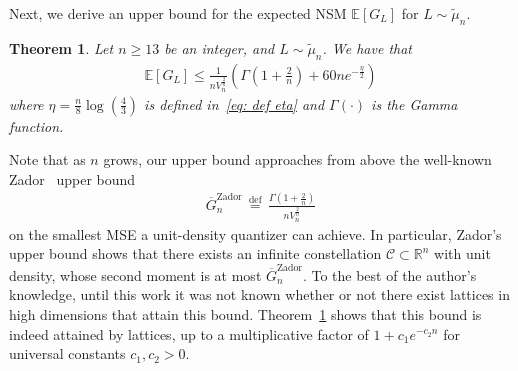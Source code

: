 \documentclass[article,doublecolumn]{IEEEtran}
\newcommand{\EE}{{\mathbb{E}}}
\newcommand{\df}{{\, \stackrel{\mathrm{def}}{=}\, }}
\newcommand{\R}{{\mathbb{R}}}
\newcommand{\CC}{{\mathcal{C}}}
\newtheorem{thm}{Theorem}[section]
\begin{document}
Next, we derive an upper bound for the expected NSM $\EE[G_L]$ for $L\sim\tilde{\mu}_n$.


\begin{thm}
Let $n\geq 13$ be an integer, and $L\sim\tilde{\mu}_n$. We have that
\begin{align}
 \EE[G_L]\leq \frac{1}{n V_n^{\frac{2}{n}}}\left(\Gamma\left(1+\frac{2}{n}\right)+60 ne^{-\frac{\eta}{2}} \right) 
\end{align}
where $\eta=\frac{n}{8}\log\left(\frac{4}{3} \right)$ is defined in~\eqref{eq: def eta} and $\Gamma(\cdot)$ is the Gamma function.
\label{thm:NSMzador}
\end{thm}

Note that as $n$ grows, our upper bound approaches from above the well-known Zador~\cite[Lemma 5]{zador1982asymptotic} upper bound
\begin{align}
\overline{G}_n^{\mathrm{Zador}}\df   \frac{\Gamma\left(1+\frac{2}{n}\right)}{n V_n^{\frac{2}{n}}} 
\label{eq:Gzador}
\end{align}
on the smallest MSE a unit-density quantizer can achieve. In particular, Zador's upper bound shows that there exists an infinite constellation $\CC\subset\R^n$ with unit density, whose second moment is at most $\overline{G}_n^{\mathrm{Zador}}$. To the best of the author's knowledge, until this work it was not known whether or not there exist lattices in high dimensions that attain this bound. Theorem~\ref{thm:NSMzador} shows that this bound is indeed attained by lattices, up to a multiplicative factor of $1+c_1 e^{-c_2 n}$ for universal constants $c_1,c_2>0$.
\end{document}
